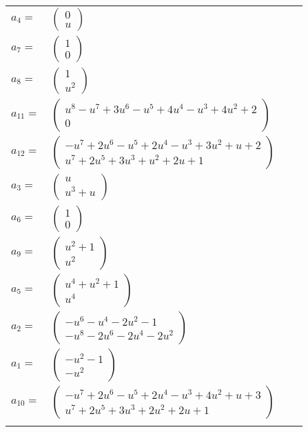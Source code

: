 \documentclass[1p]{elsarticle_modified}
\theoremstyle{definition}
\begin{document}
\begin{tabular}{m{7pt} m{180pt} m{7pt} m{180pt} }
\flushright $a_{4}=$&$\begin{pmatrix}0\\u\end{pmatrix}$ \\
\flushright $a_{7}=$&$\begin{pmatrix}1\\0\end{pmatrix}$ \\
\flushright $a_{8}=$&$\begin{pmatrix}1\\u^2\end{pmatrix}$ \\
\flushright $a_{11}=$&$\begin{pmatrix}u^8- u^7+3 u^6- u^5+4 u^4- u^3+4 u^2+2\\0\end{pmatrix}$ \\
\flushright $a_{12}=$&$\begin{pmatrix}- u^7+2 u^6- u^5+2 u^4- u^3+3 u^2+u+2\\u^7+2 u^5+3 u^3+u^2+2 u+1\end{pmatrix}$ \\
\flushright $a_{3}=$&$\begin{pmatrix}u\\u^3+u\end{pmatrix}$ \\
\flushright $a_{6}=$&$\begin{pmatrix}1\\0\end{pmatrix}$ \\
\flushright $a_{9}=$&$\begin{pmatrix}u^2+1\\u^2\end{pmatrix}$ \\
\flushright $a_{5}=$&$\begin{pmatrix}u^4+u^2+1\\u^4\end{pmatrix}$ \\
\flushright $a_{2}=$&$\begin{pmatrix}- u^6- u^4-2 u^2-1\\- u^8-2 u^6-2 u^4-2 u^2\end{pmatrix}$ \\
\flushright $a_{1}=$&$\begin{pmatrix}- u^2-1\\- u^2\end{pmatrix}$ \\
\flushright $a_{10}=$&$\begin{pmatrix}- u^7+2 u^6- u^5+2 u^4- u^3+4 u^2+u+3\\u^7+2 u^5+3 u^3+2 u^2+2 u+1\end{pmatrix}$\\&\end{tabular}
\end{document}
